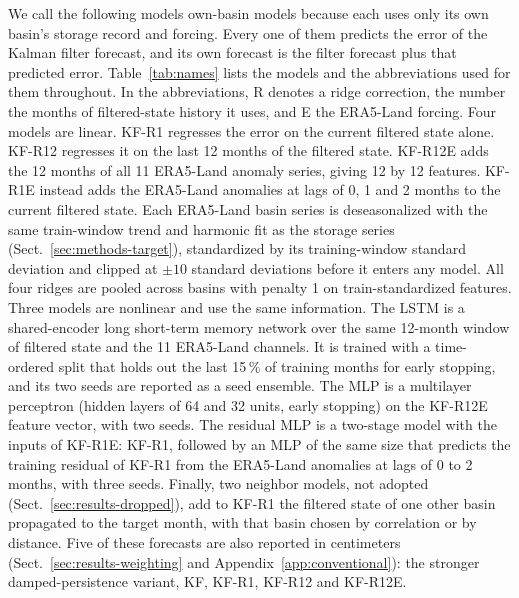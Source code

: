 \documentclass[hess, manuscript]{copernicus}
\begin{document}
We call the following models own-basin models because each uses only
its own basin's storage record and forcing. Every one of them predicts the
error of the Kalman filter forecast, and its own forecast is the filter
forecast plus that predicted error. Table~\ref{tab:names} lists the models and the
abbreviations used for them throughout. In the abbreviations, R denotes a
ridge correction, the number the months of filtered-state history it
uses, and E the ERA5-Land forcing. Four models are linear. KF-R1
regresses the error on the current filtered state alone. KF-R12 regresses
it on the last 12 months of the filtered state. KF-R12E adds the
12 months of all 11 ERA5-Land anomaly series, giving 12 by 12 features.
KF-R1E instead adds the ERA5-Land anomalies at lags of 0, 1 and 2 months to
the current filtered state. Each ERA5-Land basin series is deseasonalized
with the same train-window trend and harmonic fit as the storage series
(Sect.~\ref{sec:methods-target}), standardized by its training-window
standard deviation and clipped at $\pm 10$ standard deviations before it
enters any model. All four ridges are pooled across basins with penalty 1
on train-standardized features.
Three models are nonlinear and use the same information. The LSTM is a
shared-encoder long short-term memory network \citep{hochreiter1997lstm}
over the same 12-month window of filtered state and the 11 ERA5-Land
channels. It is trained with a time-ordered split that holds out the last
15\,\% of training months for early stopping, and its two seeds are
reported as a seed ensemble. The MLP is a multilayer perceptron (hidden layers of 64 and
32 units, early stopping) on the KF-R12E feature vector, with two seeds.
The residual MLP is a two-stage model with the inputs of KF-R1E: KF-R1,
followed by an MLP of the same size that predicts the training residual of
KF-R1 from the ERA5-Land anomalies at lags of 0 to 2 months, with three
seeds.
Finally, two neighbor models, not adopted
(Sect.~\ref{sec:results-dropped}), add to KF-R1 the filtered state of one
other basin propagated to the target month, with that basin chosen by
correlation or by distance.
Five of these forecasts are also reported in centimeters
(Sect.~\ref{sec:results-weighting} and Appendix~\ref{app:conventional}):
the stronger damped-persistence variant, KF, KF-R1, KF-R12 and KF-R12E.
\end{document}
